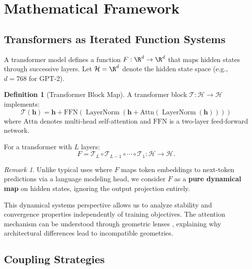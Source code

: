 \documentclass[10pt]{article} %
\theoremstyle{plain}
\theoremstyle{definition}
\newtheorem{definition}[theorem]{Definition}
\theoremstyle{remark}
\newtheorem{remark}[theorem]{Remark}
\newcommand{\cH}{\mathcal{H}}
\newcommand{\cT}{\mathcal{T}}
\newcommand{\vect}[1]{\bm{#1}}
\DeclareMathOperator{\LayerNorm}{LayerNorm}
\begin{document}
\section{Mathematical Framework}

\subsection{Transformers as Iterated Function Systems}

A transformer model defines a function $F: \R^d \to \R^d$ that maps hidden states through successive layers. Let $\cH = \R^d$ denote the hidden state space (e.g., $d = 768$ for GPT-2).

\begin{definition}[Transformer Block Map]
A transformer block $\cT: \cH \to \cH$ implements:
\begin{equation}
    \cT(\vect{h}) = \vect{h} + \text{FFN}\left(\LayerNorm\left(\vect{h} + \text{Attn}(\LayerNorm(\vect{h}))\right)\right)
\end{equation}
where $\text{Attn}$ denotes multi-head self-attention and $\text{FFN}$ is a two-layer feed-forward network.
\end{definition}

For a transformer with $L$ layers:
\begin{equation}
    F = \mathcal{T}_L \circ \mathcal{T}_{L-1} \circ \cdots \circ \mathcal{T}_1 : \cH \to \cH.
\end{equation}

\begin{remark}
Unlike typical uses where $F$ maps token embeddings to next-token predictions via a language modeling head, we consider $F$ as a \textbf{pure dynamical map} on hidden states, ignoring the output projection entirely.
\end{remark}

This dynamical systems perspective \citep{haber2017stable,chen2018neuralode} allows us to analyze stability and convergence properties independently of training objectives. The attention mechanism can be understood through geometric lenses \citep{tsai2019transformer}, explaining why architectural differences lead to incompatible geometries.

\subsection{Coupling Strategies}
\end{document}

